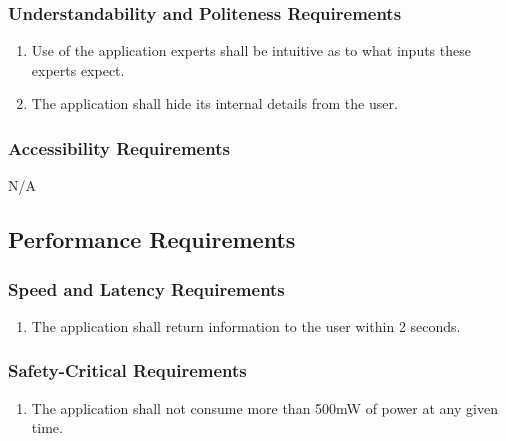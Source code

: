 \documentclass[titlepage]{article}
\newcounter{myCounter}
\begin{document}
\subsubsection{Understandability and Politeness Requirements}
\label{ssub:understandability_and_politeness_requirements}
\begin{enumerate}[{UH}1. ]
    \setcounter{enumi}{\themyCounter}
    \item Use of the application experts shall be intuitive as to what inputs these experts expect.
    \item The application shall hide its internal details from the user.
    \setcounter{myCounter}{\theenumi}
\end{enumerate}

\subsubsection{Accessibility Requirements}
\label{ssub:accessibility_requirements}
N/A

\subsection{Performance Requirements}
\label{sub:performance_requirements}
\setcounter{myCounter}{0}

\subsubsection{Speed and Latency Requirements}
\label{ssub:speed_and_latency_requirements}
\begin{enumerate}[{PR}1. ]
    \setcounter{enumi}{\themyCounter}
	\item The application shall return information to the user within 2 seconds.
    \setcounter{myCounter}{\theenumi}
\end{enumerate}

\subsubsection{Safety-Critical Requirements}
\label{ssub:safety_critical_requirements}
\begin{enumerate}[{PR}1. ]
    \setcounter{enumi}{\themyCounter}
	\item The application shall not consume more than 500mW of power at any given time.
    \setcounter{myCounter}{\theenumi}
\end{enumerate}
\end{document}
